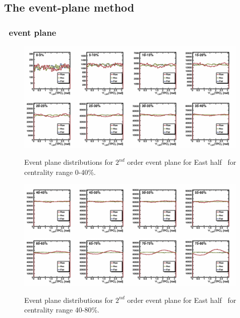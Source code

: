 \FloatBarrier
\subsection{The event-plane method}

\FloatBarrier
\subsubsection{\TPC\ event plane}

\begin{figure}[ht]
    \includegraphics[width=0.99\textwidth]{Figures/PsiEast_harm0_0.png}
    \label{fig:TPC_East_EP1}
    \caption{Event plane distributions for $2^{nd}$ order event plane for East half \TPC\ for centrality range 0-40\%.}
\end{figure}

\begin{figure}[ht]
    \includegraphics[width=0.99\textwidth]{Figures/PsiEast_harm0_1.png}
    \label{fig:TPC_East_EP2}
    \caption{Event plane distributions for $2^{nd}$ order event plane for East half \TPC\ for centrality range 40-80\%.}
\end{figure}

